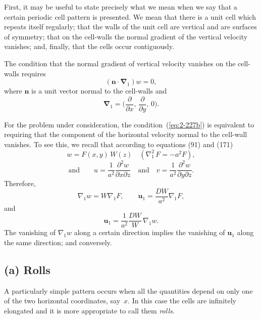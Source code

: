 First, it may be useful to state precisely what we mean when we say
that a certain periodic cell pattern is presented. We mean that there is
a unit cell which repeats itself regularly; that the walls of the unit cell
are vertical and are surfaces of symmetry; that on the cell-walls the
normal gradient of the vertical velocity vanishes; and, finally, that the
cells occur contiguously.

The condition that the normal gradient of vertical velocity vanishes
on the cell-walls requires
\begin{equation}
\label{eq:2-227b}
(\mathbf{n}\cdot\boldsymbol{\nabla}_1)w = 0,
\end{equation}
where $\mathbf{n}$ is a unit vector normal to the cell-walls and
\begin{equation}
\label{eq:2-228}
\boldsymbol{\nabla}_1 = \biggl(\frac{\partial}{\partial x},\,\frac{\partial}{\partial y},\,0\biggr).
\end{equation}

For the problem under consideration, the condition~(\ref{eq:2-227b}) is equivalent
to requiring that the component of the horizontal velocity normal to
the cell-wall vanishes. To see this, we recall that according to equations
(91) and (171)
\begin{equation}
\label{eq:2-229}
w = F(x,y)\,W(z) \quad (\nabla_1^2\,F = -a^2 F),
\end{equation}
\begin{equation}
\label{eq:2-230}
\text{and}\qquad u = \frac{1}{a^2}\frac{\partial^2 w}{\partial x\partial z} \quad\text{and}\quad v = \frac{1}{a^2}\frac{\partial^2 w}{\partial y\partial z}.
\end{equation}
Therefore,
\begin{equation}
\label{eq:2-231}
\nabla_1 w = W\nabla_1 F, \qquad \mathbf{u}_1 = \frac{DW}{a^2}\nabla_1 F,
\end{equation}
and
\begin{equation}
\label{eq:2-232}
\mathbf{u}_1 = \frac{1}{a^2}\frac{DW}{W}\,\nabla_1 w.
\end{equation}
The vanishing of $\nabla_1 w$ along a certain direction implies the vanishing
of $\mathbf{u}_1$ along the same direction; and conversely.

\subsection*{(a) Rolls}

A particularly simple pattern occurs when all the quantities depend
on only one of the two horizontal coordinates, say~$x$. In this case the
cells are infinitely elongated and it is more appropriate to call them \emph{rolls}.

